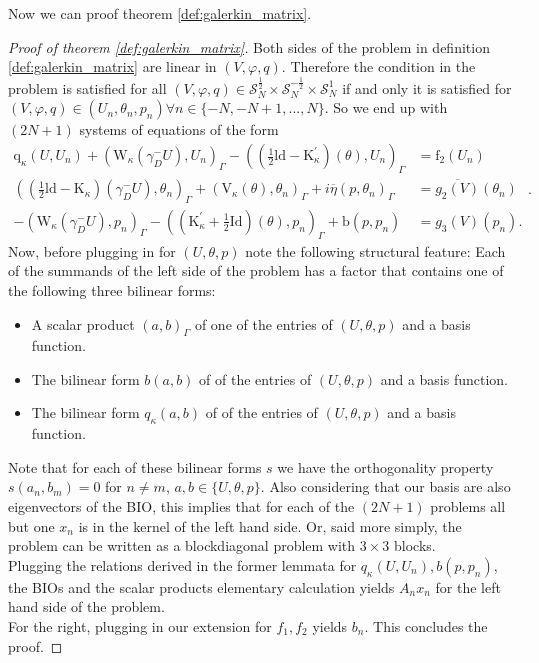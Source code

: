 \documentclass[10pt,journal,compsoc, onecolumn]{IEEEtran}
\begin{document}
Now we can proof theorem \ref{def:galerkin_matrix}.
\begin{proof}[Proof of theorem \ref{def:galerkin_matrix}]
    Both sides of the problem in definition \ref{def:galerkin_matrix} are linear in $(V, \varphi, q)$. 
    Therefore the condition in the problem is satisfied for all 
    $(V, \varphi, q)\in \mathcal{S}^{\frac{1}{2}}_N  \times  \mathcal{S}^{-\frac{1}{2}}_N \times  \mathcal{S}^{1}_N$
    if and only it is satisfied for $(V, \varphi, q) \in (U_n, \theta_n, p_n) \forall n \in \{-N, -N+1, ..., N\}$.
    So we end up with $(2N + 1)$ systems of equations of the form 
    $$
    \begin{aligned}
        \mathrm{q}_{\kappa}(U, U_n)+\left(\mathrm{W}_{\kappa}\left(\gamma_{D}^{-} U\right), U_n\right)_{\Gamma}-\left((\frac{1}{2} \mathrm{ld}-\mathrm{K}_{\kappa}^{\prime})(\theta),U_n\right)_{\Gamma} &=\mathrm{f}_{2}(U_n) \\
        \left((\frac{1}{2} \mathrm{ld}-\mathrm{K}_{\kappa})\left(\gamma_{D}^{-} U\right), \theta_n\right)_{\Gamma}+\left(\mathrm{V}_{\kappa}(\theta), \theta_n\right)_{\Gamma}+i \overline{\eta}(p, \theta_n)_{\Gamma} &=\overline{g_2(V)}(\theta_n) \\
        -\left(\mathrm{W}_{\kappa}\left(\gamma_{D}^{-} U\right), p_n\right)_{\Gamma}-\left((\mathrm{K}_{\kappa}^{\prime}+\frac{1}{2} \mathrm{Id})(\theta), p_n\right)_{\Gamma}+\mathrm{b}(p, p_n) &=g_3(V)(p_n).
    \end{aligned}.
    $$
    Now, before plugging in for $(U, \theta, p)$ note the following structural feature: 
    Each of the summands of the left side of the problem has a factor that contains one of the following three bilinear forms:
    \begin{itemize}
        \item A scalar product $(a,b)_\Gamma$ of one of the entries of $(U, \theta, p)$ and a basis function. 
        \item The bilinear form $b(a,b)$ of of the entries of $(U, \theta, p)$ and a basis function. 
        \item The bilinear form $q_\kappa(a,b)$ of of the entries of $(U, \theta, p)$ and a basis function. 
    \end{itemize}
    Note that for each of these bilinear forms $s$ we have the orthogonality property $s(a_n, b_m) = 0$ for $n \neq m$, $a, b \in \{U, \theta, p\}$.
    Also considering that our basis are also eigenvectors of the BIO, this implies that for each of the $(2N + 1)$ problems all but one $x_n$ is in the kernel of the left hand side.
    Or, said more simply, the problem can be written as a blockdiagonal problem with $3 \times 3$ blocks. \\
    Plugging the relations derived in the former lemmata for $q_\kappa (U, U_n), b(p, p_n)$, 
    the BIOs and the scalar products elementary calculation yields
    $A_n x_n$ for the left hand side of the problem.  \\
    For the right, plugging in our extension for $f_1, f_2$ yields $b_n$.
    This concludes the proof. 
\end{proof} 
\end{document}
